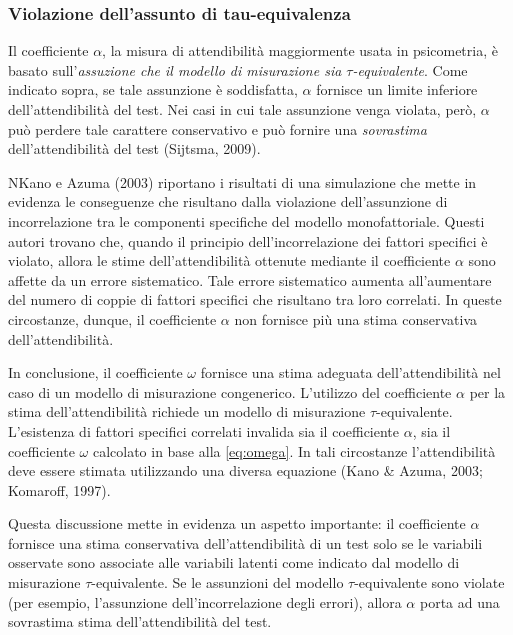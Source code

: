 \documentclass[
  11pt,
]{krantz}
\theoremstyle{definition}
\theoremstyle{definition}
\theoremstyle{definition}
\theoremstyle{definition}
\theoremstyle{remark}
\begin{document}
\hypertarget{sec:violazione_tau}{%
\subsubsection{Violazione dell'assunto di tau-equivalenza}\label{sec:violazione_tau}}

Il coefficiente \(\alpha\), la misura di attendibilità maggiormente usata in psicometria, è basato sull'\emph{assuzione che il modello di misurazione sia \(\tau\)-equivalente}. Come indicato sopra, se tale assunzione è soddisfatta, \(\alpha\) fornisce un limite inferiore dell'attendibilità del test. Nei casi in cui tale assunzione venga violata, però, \(\alpha\) può perdere tale carattere conservativo e può fornire una \emph{sovrastima} dell'attendibilità del test (Sijtsma, 2009).

NKano e Azuma (2003) riportano i risultati di una simulazione che mette in evidenza le conseguenze che risultano dalla violazione dell'assunzione di incorrelazione tra le componenti specifiche del modello monofattoriale. Questi autori trovano che, quando il principio dell'incorrelazione dei fattori specifici è violato, allora le stime dell'attendibilità ottenute mediante il coefficiente \(\alpha\) sono affette da un errore sistematico. Tale errore sistematico aumenta all'aumentare del numero di coppie di fattori specifici che risultano tra loro correlati. In queste circostanze, dunque, il coefficiente \(\alpha\) non fornisce più una stima conservativa dell'attendibilità.

In conclusione, il coefficiente \(\omega\) fornisce una stima adeguata dell'attendibilità nel caso di un modello di misurazione congenerico. L'utilizzo del coefficiente \(\alpha\) per la stima dell'attendibilità richiede un modello di misurazione \(\tau\)-equivalente. L'esistenza di fattori specifici correlati invalida sia il coefficiente \(\alpha\), sia il coefficiente \(\omega\) calcolato in base alla \eqref{eq:omega}. In tali circostanze l'attendibilità deve essere stimata utilizzando una diversa equazione (Kano \& Azuma, 2003; Komaroff, 1997).

Questa discussione mette in evidenza un aspetto importante: il coefficiente \(\alpha\) fornisce una stima conservativa dell'attendibilità di un test solo se le variabili osservate sono associate alle variabili latenti come indicato dal modello di misurazione \(\tau\)-equivalente. Se le assunzioni del modello \(\tau\)-equivalente sono violate (per esempio, l'assunzione dell'incorrelazione degli errori), allora \(\alpha\) porta ad una sovrastima stima dell'attendibilità del test.
\end{document}
